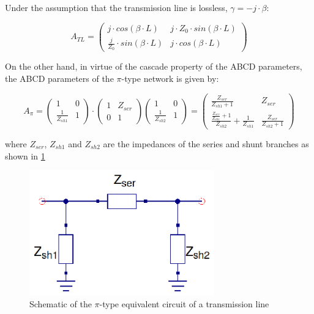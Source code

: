 \noindent Under the assumption that the transmission line is lossless, $\gamma = -j\cdot \beta$:

\begin{equation}
A_{TL} = \begin{pmatrix}
    j\cdot cos(\beta \cdot L)       & j \cdot Z_0 \cdot sin(\beta \cdot L) \\
    \frac{j}{Z_0} \cdot sin(\beta \cdot L) & j \cdot cos(\beta \cdot L)
\end{pmatrix}
\label{eq:ABCD_TL}
\end{equation}

\noindent On the other hand, in virtue of the cascade property of the ABCD parameters, the ABCD parameters of the $\pi$-type network is given by:

\begin{equation}
A_{\pi} = \begin{pmatrix}
     1       & 0 \\
   \frac{1}{Z_{sh1}} & 1
\end{pmatrix} \cdot
\begin{pmatrix}
     1       & Z_{ser} \\
    0 & 1
\end{pmatrix}
\begin{pmatrix}
     1       & 0 \\
    \frac{1}{Z_{sh2}} & 1
\end{pmatrix} = 
\begin{pmatrix}
     \frac{Z_{ser}}{Z_{sh1} + 1}      & Z_{ser} \\
     \frac{\frac{Z_{ser}}{Z_{sh1}}+ 1}{Z_{sh2}} + \frac{1}{Z_{sh1}} & \frac{Z_{ser}}{Z_{sh2} + 1} 
\end{pmatrix}
\label{eq:ABCD_PI}
\end{equation}

\noindent where $Z_{ser}$, $Z_{sh1}$ and $Z_{sh2}$ are the impedances of the series and shunt branches as shown in \ref{fig:Transmission-Line-Circuit-Equivalent-Schematic} 

\begin{figure}[H]
\centering
\includegraphics[width=80mm]{pi-equivalent-circuit}
\caption{Schematic of the $\pi$-type equivalent circuit of a transmission line}
\label{fig:Transmission-Line-Circuit-Equivalent-Schematic}
\end{figure}

